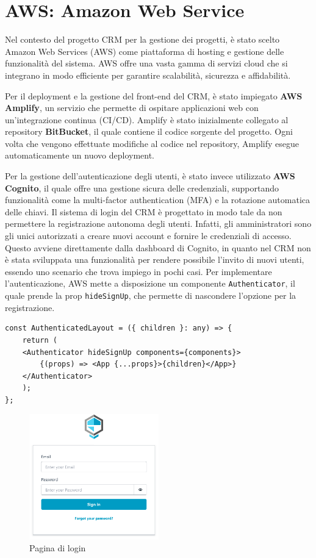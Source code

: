 \documentclass[target=bach,aauheader=,style=]{thud}
\begin{document}
\section{AWS: Amazon Web Service}
Nel contesto del progetto CRM per la gestione dei progetti, è stato scelto Amazon Web Services (AWS) come piattaforma di hosting e gestione delle funzionalità del sistema. AWS offre una vasta gamma di servizi cloud che si integrano in modo efficiente per garantire scalabilità, sicurezza e affidabilità.

\noindent Per il deployment e la gestione del front-end del CRM, è stato impiegato \textbf{AWS Amplify}, un servizio che permette di ospitare applicazioni web con un'integrazione continua (CI/CD). Amplify è stato inizialmente collegato al repository \textbf{BitBucket}, il quale contiene il codice sorgente del progetto. Ogni volta che vengono effettuate modifiche al codice nel repository, Amplify esegue automaticamente un nuovo deployment.

\noindent Per la gestione dell'autenticazione degli utenti, è stato invece utilizzato \textbf{AWS Cognito}, il quale offre una gestione sicura delle credenziali, supportando funzionalità come la multi-factor authentication (MFA) e la rotazione automatica delle chiavi. Il sistema di login del CRM è progettato in modo tale da non permettere la registrazione autonoma degli utenti. Infatti, gli amministratori sono gli unici autorizzati a creare nuovi account e fornire le credenziali di accesso. Questo avviene direttamente dalla dashboard di Cognito, in quanto nel CRM non è stata sviluppata una funzionalità per rendere possibile l'invito di nuovi utenti, essendo uno scenario che trova impiego in pochi casi. Per implementare l'autenticazione, AWS mette a disposizione un componente \texttt{Authenticator}, il quale prende la prop \texttt{hideSignUp}, che permette di nascondere l'opzione per la registrazione.

\begin{lstlisting}[caption=Parte del file \texttt{AuthenticatedLayout.tsx} del CRM]
const AuthenticatedLayout = ({ children }: any) => {
    return (
    <Authenticator hideSignUp components={components}>
        {(props) => <App {...props}>{children}</App>}
    </Authenticator>
    );
};
\end{lstlisting}

\begin{figure}[H]
    \centering
    \includegraphics[width=0.5\textwidth]{img/login.pdf} 
    \caption{Pagina di login}
\end{figure}
\end{document}
